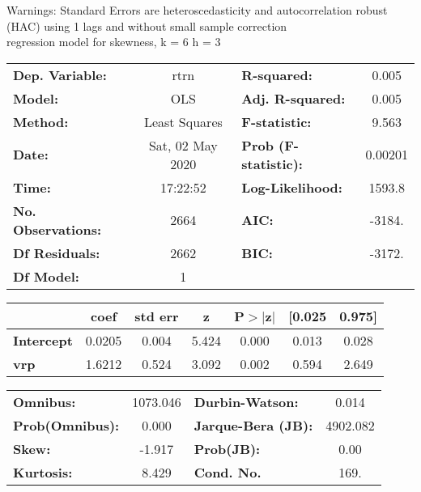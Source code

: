 Warnings: \newline
 [1] Standard Errors are heteroscedasticity and autocorrelation robust (HAC) using 1 lags and without small sample correction\\ 

regression model for skewness, k = 6 h = 3\begin{center}
\begin{tabular}{lclc}
\toprule
\textbf{Dep. Variable:}    &       rtrn       & \textbf{  R-squared:         } &     0.005   \\
\textbf{Model:}            &       OLS        & \textbf{  Adj. R-squared:    } &     0.005   \\
\textbf{Method:}           &  Least Squares   & \textbf{  F-statistic:       } &     9.563   \\
\textbf{Date:}             & Sat, 02 May 2020 & \textbf{  Prob (F-statistic):} &  0.00201    \\
\textbf{Time:}             &     17:22:52     & \textbf{  Log-Likelihood:    } &    1593.8   \\
\textbf{No. Observations:} &        2664      & \textbf{  AIC:               } &    -3184.   \\
\textbf{Df Residuals:}     &        2662      & \textbf{  BIC:               } &    -3172.   \\
\textbf{Df Model:}         &           1      & \textbf{                     } &             \\
\bottomrule
\end{tabular}
\begin{tabular}{lcccccc}
                   & \textbf{coef} & \textbf{std err} & \textbf{z} & \textbf{P$> |$z$|$} & \textbf{[0.025} & \textbf{0.975]}  \\
\midrule
\textbf{Intercept} &       0.0205  &        0.004     &     5.424  &         0.000        &        0.013    &        0.028     \\
\textbf{vrp}       &       1.6212  &        0.524     &     3.092  &         0.002        &        0.594    &        2.649     \\
\bottomrule
\end{tabular}
\begin{tabular}{lclc}
\textbf{Omnibus:}       & 1073.046 & \textbf{  Durbin-Watson:     } &    0.014  \\
\textbf{Prob(Omnibus):} &   0.000  & \textbf{  Jarque-Bera (JB):  } & 4902.082  \\
\textbf{Skew:}          &  -1.917  & \textbf{  Prob(JB):          } &     0.00  \\
\textbf{Kurtosis:}      &   8.429  & \textbf{  Cond. No.          } &     169.  \\
\bottomrule
\end{tabular}
\end{center}

